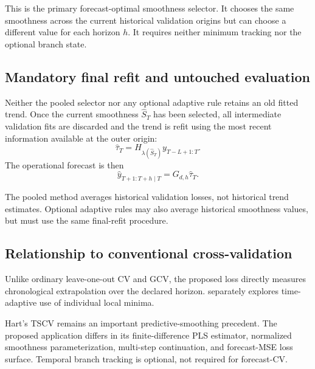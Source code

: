 This is the primary forecast-optimal smoothness selector. It chooses the same smoothness across the current historical validation origins but can choose a different value for each horizon $h$. It requires neither minimum tracking nor the optional branch state.

\subsection{Mandatory final refit and untouched evaluation}

Neither the pooled selector nor any optional adaptive rule retains an old fitted trend. Once the current smoothness $\widehat S_T$ has been selected, all intermediate validation fits are discarded and the trend is refit using the most recent information available at the outer origin:
\begin{equation}
\label{eq:final_refit}
\widehat\tau_T
=
H_{\lambda(\widehat S_T)}
y_{T-L+1:T}.
\end{equation}
The operational forecast is then
\begin{equation}
\label{eq:final_operational_forecast}
\widehat y_{T+1:T+h\mid T}
=
G_{d,h}\widehat\tau_T.
\end{equation}

The pooled method averages historical validation losses, not historical trend estimates. Optional adaptive rules may also average historical smoothness values, but must use the same final-refit procedure.

\subsection{Relationship to conventional cross-validation}

Unlike ordinary leave-one-out CV and GCV, the proposed loss directly measures chronological extrapolation over the declared horizon.  separately explores time-adaptive use of individual local minima.

Hart's TSCV \cite{hart1994tscv} remains an important predictive-smoothing precedent. The proposed application differs in its finite-difference PLS estimator, normalized smoothness parameterization, multi-step continuation, and forecast-MSE loss surface. Temporal branch tracking is optional, not required for forecast-CV.
